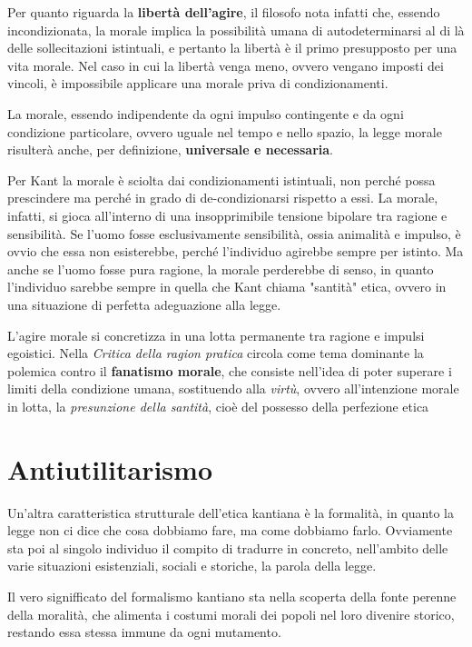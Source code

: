 \documentclass[a4paper, twoside, titlepage]{book}
\begin{document}
Per quanto riguarda la \textbf{libertà dell’agire}, il filosofo nota infatti che, essendo incondizionata, la morale implica la possibilità umana di autodeterminarsi al di là delle sollecitazioni istintuali, e pertanto la libertà è il primo presupposto per una vita morale. Nel caso in cui la libertà venga meno, ovvero vengano imposti dei vincoli, è impossibile applicare una morale priva di condizionamenti.

La morale, essendo indipendente da ogni impulso contingente e da ogni condizione particolare, ovvero uguale nel tempo e nello spazio, la legge morale risulterà anche, per definizione, \textbf{universale e necessaria}.

Per Kant la morale è sciolta dai condizionamenti istintuali, non perché possa prescindere ma perché in grado di de-condizionarsi rispetto a essi. 
La morale, infatti, si gioca all’interno di una insopprimibile tensione bipolare tra ragione e sensibilità.
Se l'uomo fosse esclusivamente sensibilità, ossia animalità e impulso, è ovvio che essa non esisterebbe, perché l’individuo agirebbe sempre per istinto. Ma anche se l'uomo fosse pura ragione, la morale perderebbe di senso, in quanto l'individuo sarebbe sempre in quella che Kant chiama "santità" etica, ovvero in una situazione di perfetta adeguazione alla legge.

L’agire morale si concretizza in una lotta permanente tra ragione e impulsi egoistici.
Nella \textit{Critica della ragion pratica} circola come tema dominante la polemica contro il \textbf{fanatismo morale}, che consiste nell’idea di poter superare i limiti della condizione umana, sostituendo alla \textit{virtù}, ovvero all’intenzione morale in lotta, la \textit{presunzione della santità}, cioè del possesso della perfezione etica

\section{Antiutilitarismo}

Un’altra caratteristica strutturale dell’etica kantiana è la formalità, in quanto la legge non ci dice che cosa dobbiamo fare, ma come dobbiamo farlo.
Ovviamente sta poi al singolo individuo il compito di tradurre in concreto, nell’ambito delle varie situazioni esistenziali, sociali e storiche, la parola della legge.

Il vero signifficato del formalismo kantiano sta nella scoperta della fonte perenne della moralità, che alimenta i costumi morali dei popoli nel loro divenire storico, restando essa stessa immune da ogni mutamento.
\end{document}
